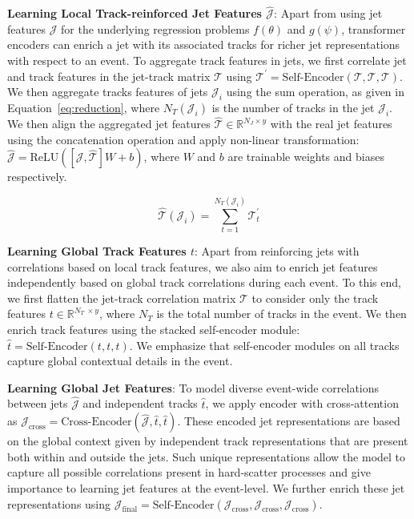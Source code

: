 


\textbf{Learning Local Track-reinforced Jet Features $\hat{\mathcal{J}}$}: Apart from using jet features $\mathcal{J}$ for the underlying regression problems $f(\theta)$ and $g(\psi)$, transformer encoders can enrich a jet with its associated tracks for richer jet representations with respect to an event. To aggregate track features in jets, we first correlate jet and track features in the jet-track matrix $\mathcal{T}$ using $\mathcal{T}^{\prime} = \text{Self-Encoder}(\mathcal{T},\mathcal{T},\mathcal{T})$. We then aggregate tracks features of jets $\mathcal{J}_i$ using the sum operation, as given in Equation~\ref{eq:reduction}, where $N_T(\mathcal{J}_i)$ is the number of tracks in the jet $\mathcal{J}_i$. We then align the aggregated jet features $\hat{\mathcal{T}} \in \mathbb{R}^{N_J \times y}$ with the real jet features using the concatenation operation and apply non-linear transformation: $\hat{\mathcal{J}} = \text{ReLU}([\mathcal{J},\hat{\mathcal{T}}]W + b)$, where $W$ and $b$ are trainable weights and biases respectively.

\begin{equation}
\hat{\mathcal{T}}(\mathcal{J}_i) = \sum_{t=1}^{N_T(\mathcal{J}_i)} \mathcal{T}_{t}^{\prime}
\label{eq:reduction}
\end{equation}

\textbf{Learning Global Track Features $t$}: Apart from reinforcing jets with correlations based on local track features, we also aim to enrich jet features independently based on global track correlations during each event. To this end, we first flatten the jet-track correlation matrix $\mathcal{T}$ to consider only the track features $t \in \mathbb{R}^{N_{T} \ \times y}$, where $N_{T}$ is the total number of tracks in the event. We then enrich track features using the stacked self-encoder module: $\hat{t} = \text{Self-Encoder}(t,t,t)$. We emphasize that self-encoder modules on all tracks capture global contextual details in the event. 

\textbf{Learning Global Jet Features}: To model diverse event-wide correlations between jets $\hat{\mathcal{J}}$ and independent tracks $\hat{t}$, we apply encoder with cross-attention as $\mathcal{J}_{\text{cross}} = \text{Cross-Encoder}(\hat{\mathcal{J}},\hat{t},\hat{t})$. These encoded jet representations are based on the global context given by independent track representations that are present both within and outside the jets. Such unique representations allow the model to capture all possible correlations present in hard-scatter processes and give importance to learning jet features at the event-level. We further enrich these jet representations using $\mathcal{J}_{\text{final}} = \text{Self-Encoder}(\mathcal{J}_{\text{cross}},\mathcal{J}_{\text{cross}},\mathcal{J}_{\text{cross}})$.


